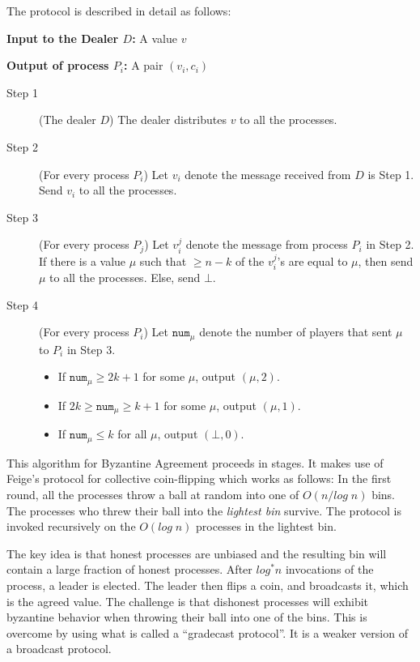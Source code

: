 The protocol is described in detail as follows:

\textbf{Input to the Dealer $D$:} A value $v$ 

\textbf{Output of process $P_i$:} A pair $(v_i, c_i)$
\begin{description}
\item[Step 1] (The dealer $D$) The dealer distributes $v$ to all the processes.
\item[Step 2] (For every process $P_i$) Let $v_i$ denote the message received from $D$ is Step 1. Send $v_i$ to all the processes. 
\item[Step 3] (For every process $P_j$) Let $v_i^j$ denote the message from process $P_i$ in Step 2. If there is a value $\mu$ such that $\geq n - k$ of the $v_i^j$'s are equal to $\mu$, then send $\mu$ to all the processes. Else, send $\bot$.
\item[Step 4] (For every process $P_i$) Let $\mathtt{num}_\mu$ denote the number of players that sent $\mu$ to $P_i$ in Step 3.
\begin{itemize}
\item If $\mathtt{num}_\mu \geq 2k + 1$ for some $\mu$, output $(\mu, 2)$.
\item If $2k \geq \mathtt{num}_\mu \geq k + 1$ for some $\mu$, output $(\mu, 1)$.
\item If $\mathtt{num}_\mu \leq k $ for all $\mu$, output $(\bot, 0)$.
\end{itemize}
\end{description}



This algorithm for Byzantine Agreement proceeds in stages. It makes use of Feige's protocol \cite{Feige99} for collective coin-flipping which works as follows: In the first round, all the processes throw a ball at random into one of $O(n/log\;n)$ bins. The processes who threw their ball into the \textit{lightest bin} survive. The protocol is invoked recursively on the $O(log\;n)$ processes in the lightest bin. 


The key idea is that honest processes are unbiased and the resulting bin will contain a large fraction of honest processes. After $log^* n$ invocations of the process, a leader is elected. The leader then flips a coin, and broadcasts it, which is the agreed value. The challenge is that dishonest processes will exhibit byzantine behavior when throwing their ball into one of the bins. This is overcome by using what is called a ``gradecast protocol''. It is a weaker version of a broadcast protocol.

